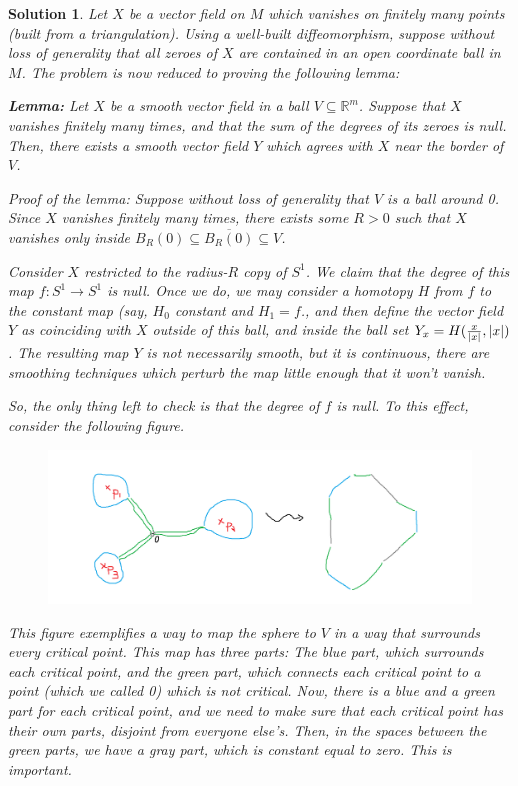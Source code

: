 \documentclass{article}
\theoremstyle{nonumberplain}
\newtheorem{sol}{Solution}
\newcommand{\R}{\mathbb{R}}
\DeclarePairedDelimiter{\abs}{\lvert}{\rvert}
\begin{document}
\begin{sol}
Let $X$ be a vector field on $M$ which vanishes on finitely many points (built from a triangulation). Using a well-built diffeomorphism, suppose without loss of generality that all zeroes of $X$ are contained in an open coordinate ball in $M$. The problem is now reduced to proving the following lemma:

\smallskip

\textbf{Lemma:} Let $X$ be a smooth vector field in a ball $V \subseteq \R^m$. Suppose that $X$ vanishes finitely many times, and that the sum of the degrees of its zeroes is null. Then, there exists a smooth vector field $Y$ which agrees with $X$ near the border of $V$.

Proof of the lemma: Suppose without loss of generality that $V$ is a ball around 0. Since $X$ vanishes finitely many times, there exists some $R > 0$ such that $X$ vanishes only inside $B_R(0) \subseteq \overline{B_R(0)} \subseteq V$.

Consider $X$ restricted to the radius-$R$ copy of $S^1$. We claim that the degree of this map $f \colon S^1 \to S^1$ is null. Once we do, we may consider a homotopy $H$ from $f$ to the constant map (say, $H_0$ constant and $H_1 = f$., and then define the vector field $Y$ as coinciding with $X$ outside of this ball, and inside the ball set $Y_x = H(\frac x{\abs{x}}, \abs{x})$. The resulting map $Y$ is not necessarily smooth, but it is continuous, there are smoothing techniques which perturb the map little enough that it won't vanish.

So, the only thing left to check is that the degree of $f$ is null. To this effect, consider the following figure.

\begin{figure}[H]
\centering
\includegraphics[width=\linewidth]{euler}
\end{figure}

This figure exemplifies a way to map the sphere to $V$ in a way that surrounds every critical point. This map has three parts: The blue part, which surrounds each critical point, and the green part, which connects each critical point to a point (which we called 0) which is not critical. Now, there is a blue and a green part for each critical point, and we need to make sure that each critical point has their own parts, disjoint from everyone else's. Then, in the spaces between the green parts, we have a gray part, which is constant equal to zero. This is important.


\end{sol}
\end{document}
